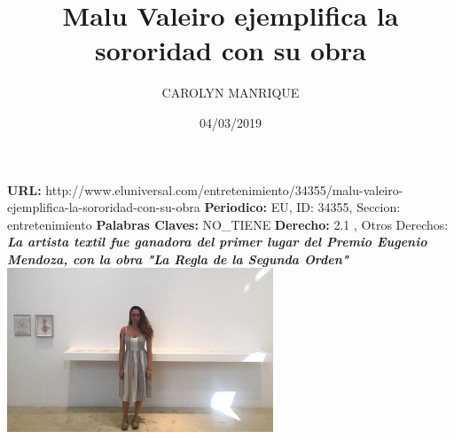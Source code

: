 \documentclass{article}%
\title{\textbf{Malu Valeiro ejemplifica la sororidad con su obra}}%
\author{CAROLYN MANRIQUE}%
\date{04/03/2019}%
\begin{document}
%
\normalsize%
\maketitle%
\textbf{URL: }%
http://www.eluniversal.com/entretenimiento/34355/malu{-}valeiro{-}ejemplifica{-}la{-}sororidad{-}con{-}su{-}obra\newline%
%
\textbf{Periodico: }%
EU, %
ID: %
34355, %
Seccion: %
entretenimiento\newline%
%
\textbf{Palabras Claves: }%
NO\_TIENE\newline%
%
\textbf{Derecho: }%
2.1%
, Otros Derechos: %
\newline%
%
\textbf{\textit{La artista textil fue ganadora del primer lugar del Premio Eugenio Mendoza, con la obra "La Regla de la Segunda Orden"}}%
\newline%
\newline%
%
\includegraphics[width=300px]{EU_34355.jpg}%
\newline%
%
\end{document}
